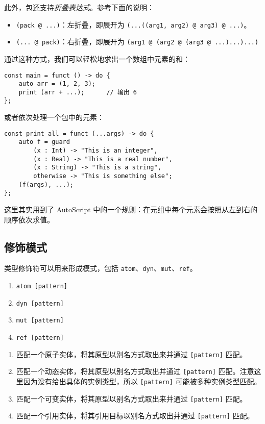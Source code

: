 此外，包还支持\emph{折叠表达式}。参考下面的说明：

\begin{itemize}
	\item \lstinline!(pack @ ...)!：左折叠，即展开为 \lstinline!(...((arg1, arg2) @ arg3) @ ...)!。
	\item \lstinline!(... @ pack)!：右折叠，即展开为 \lstinline!(arg1 @ (arg2 @ (arg3 @ ...)...)...)!
\end{itemize}

通过这种方式，我们可以轻松地求出一个数组中元素的和：

\begin{lstlisting}
const main = funct () -> do {
	auto arr = (1, 2, 3);
	print (arr + ...);		// 输出 6
};
\end{lstlisting}

或者依次处理一个包中的元素：

\begin{lstlisting}
const print_all = funct (...args) -> do {
	auto f = guard
		(x : Int) -> "This is an integer",
		(x : Real) -> "This is a real number",
		(x : String) -> "This is a string",
		otherwise -> "This is something else";
	(f(args), ...);
};
\end{lstlisting}

这里其实用到了 AutoScript 中的一个规则：在元组中每个元素会按照从左到右的顺序依次求值。

\subsection{修饰模式}

类型修饰符可以用来形成模式，包括 \lstinline!atom!、\lstinline!dyn!、\lstinline!mut!、\lstinline!ref!。

\begin{grammar} \label{grm:qualifier-pattern}
\begin{enumerate}
    \item \lstinline!atom [pattern]!
    \item \lstinline!dyn [pattern]!
    \item \lstinline!mut [pattern]!
    \item \lstinline!ref [pattern]!
\end{enumerate}
\end{grammar}

\begin{enumerate}
    \item 匹配一个原子实体，将其原型以别名方式取出来并通过 \lstinline![pattern]! 匹配。
    \item 匹配一个动态实体，将其原型以别名方式取出并通过 \lstinline![pattern]! 匹配。注意这里因为没有给出具体的实例类型，所以 \lstinline![pattern]! 可能被多种实例类型匹配。
    \item 匹配一个可变实体，将其原型以别名方式取出来并通过 \lstinline![pattern]! 匹配。
    \item 匹配一个引用实体，将其引用目标以别名方式取出并通过 \lstinline![pattern]! 匹配。
\end{enumerate}

